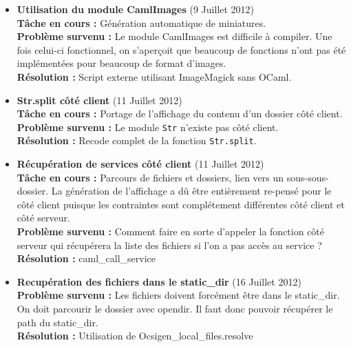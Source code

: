 \documentclass{life-fr}
\begin{document}
\begin{itemize}
  \item \textbf{Utilisation du module CamlImages} (9 Juillet 2012)\\
    \textbf{Tâche en cours :} Génération automatique de miniatures.\\
    \textbf{Problème survenu :} Le module CamlImages est difficile à compiler. Une fois celui-ci fonctionnel, on s'aperçoit que beaucoup de fonctions n'ont pas été implémentées pour beaucoup de format d'images.\\
    \textbf{Résolution :} Script externe utilisant ImageMagick sans OCaml.

  \item \textbf{Str.split côté client} (11 Juillet 2012)\\
    \textbf{Tâche en cours :} Portage de l'affichage du contenu d'un dossier côté client.\\
    \textbf{Problème survenu :} Le module \texttt{Str} n'existe pas côté client.\\
    \textbf{Résolution :} Recode complet de la fonction \texttt{Str.split}.

  \item \textbf{Récupération de services côté client} (11 Juillet 2012)\\
    \textbf{Tâche en cours :} Parcours de fichiers et dossiers, lien vers un sous-sous-dossier. La génération de l'affichage a dû être entièrement re-pensé pour le côté client puisque les contraintes sont complétement différentes côté client et côté serveur.\\
    \textbf{Problème survenu :} Comment faire en sorte d'appeler la fonction côté serveur qui récupérera la liste des fichiers si l'on a pas accès au service ? \\
    \textbf{Résolution :} caml\_call\_service

  \item \textbf{Recupération des fichiers dans le static\_dir} (16 Juillet 2012)\\
    \textbf{Problème survenu :} Les fichiers doivent forcément être dans le static\_dir. On doit parcourir le dossier avec opendir. Il faut donc pouvoir récupérer le path du static\_dir. \\
    \textbf{Résolution :} Utilisation de Ocsigen\_local\_files.resolve

\end{itemize}

\end{document}
